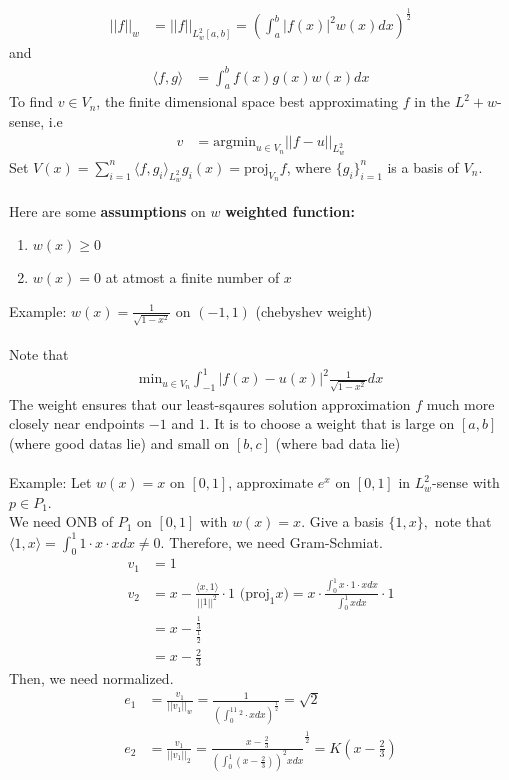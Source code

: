 \documentclass[11pt,oneside]{book}
\theoremstyle{break}
\theoremstyle{break}
\newcommand{\example}{\color{purple}Example: \color{black}}
\begin{document}
\begin{align*}
||f||_w&=||f||_{L^2_{w}[a,b]}=\left(\int_{a}^b |f(x)|^2w(x)dx \right)^{\frac{1}{2}}
\end{align*}
and \begin{align*}
\langle f,g\rangle &=\int_{a}^{b}f(x)g(x)w(x)dx
\end{align*}
To find $v\in V_n$, the finite dimensional space best approximating $f$ in the $L^2+w$-sense, i.e \begin{align*}
v&=\text{argmin}_{u\in V_n}||f-u||_{L^2_w}
\end{align*}
Set $V(x)=\sum_{i=1}^n\langle f,g_i\rangle _{L^2_w}g_i(x)=\text{proj}_{V_n}f$, where $\{g_i\}^n_{i=1}$ is a basis of $V_n$.\\
\hfill\\
Here are some \textbf{assumptions }on $w$ \textbf{weighted function:}\begin{enumerate}
\item $w(x)\geq 0$
\item $w(x)=0$ at atmost a finite number of $x$
\end{enumerate}
\example $w(x)=\frac{1}{\sqrt{1-x^2}}$ on $(-1,1)$ (chebyshev weight)\\
\hfill\\
Note that \begin{align*}
\text{min}_{u\in V_n}\int_{-1}^{1}|f(x)-u(x)|^2 \frac{1}{\sqrt{1-x^2}} dx
\end{align*}
The weight ensures that our least-sqaures solution approximation $f$ much more closely near endpoints $-1$ and $1$. It is to choose a weight that is large on $[a,b]$ (where good datas lie) and small on $[b,c]$ (where bad data lie)\\
\hfill\\
\example Let $w(x)=x$ on $[0,1]$, approximate $e^x$ on $[0,1]$ in $L^2_{w}$-sense with $p\in P_1$. \\
We need ONB of $P_1$ on $[0,1]$ with $w(x)=x$. Give a basis $\{1,x\},$ note that $\langle 1,x\rangle =\int_{0}^{1}1\cdot x\cdot xdx\neq 0.$ Therefore, we need Gram-Schmiat. \begin{align*}
v_1&=1\\
v_2&=x-\frac{\langle x,1\rangle}{||1||^2}\cdot 1 \text{ (proj}_1x)=x\cdot \frac{\int_{0}^1x\cdot 1\cdot xdx}{\int_{0}^1xdx}\cdot 1\\
&= x-\frac{\frac{1}{3}}{\frac{1}{2}}\\
&= x-\frac{2}{3}
\end{align*}
Then, we need normalized. \begin{align*}
e_1&=\frac{v_1}{||v_1||_w}=\frac{1}{\left(\int_{0}^11^2\cdot x dx\right)^{\frac{1}{2}}}=\sqrt{2}\\
e_2&=\frac{v_1}{||v_1||_2}=\frac{x-\frac{2}{3}}{\left(\int_{0}^{1}\left(x-\frac{2}{3}\right)\right)^2xdx}^{\frac{1}{2}}=K(x-\frac{2}{3})
\end{align*}
\end{document}

